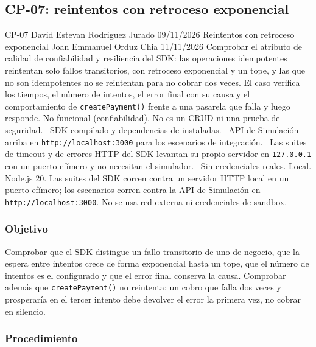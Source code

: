 \subsection{CP-07: reintentos con retroceso exponencial}
\label{sec:cp07}

\FichaCaso
  {CP-07}
  {David Estevan Rodriguez Jurado}
  {09/11/2026}
  {Reintentos con retroceso exponencial}
  {Joan Emmanuel Orduz Chia}
  {11/11/2026}
  {Comprobar el atributo de calidad de confiabilidad y resiliencia del SDK: las operaciones idempotentes reintentan solo fallos transitorios, con retroceso exponencial y un tope, y las que no son idempotentes no se reintentan para no cobrar dos veces. El caso verifica los tiempos, el número de intentos, el error final con su causa y el comportamiento de \texttt{createPayment()} frente a una pasarela que falla y luego responde.}
  {No funcional (confiabilidad). No es un CRUD ni una prueba de seguridad.}
  {\textbullet\ SDK compilado y dependencias de  instaladas.\newline
   \textbullet\ API de Simulación arriba en \texttt{http://localhost:3000} para los escenarios de integración.\newline
   \textbullet\ Las suites de timeout y de errores HTTP del SDK levantan su propio servidor en \texttt{127.0.0.1} con un puerto efímero y no necesitan el simulador.\newline
   \textbullet\ Sin credenciales reales.}
  {Local. Node.js 20. Las suites del SDK corren contra un servidor HTTP local en un puerto efímero; los escenarios corren contra la API de Simulación en \texttt{http://localhost:3000}. No se usa red externa ni credenciales de sandbox.}

\subsubsection{Objetivo}

Comprobar que el SDK distingue un fallo transitorio de uno de negocio, que la espera entre intentos crece de forma exponencial hasta un tope, que el número de intentos es el configurado y que el error final conserva la causa. Comprobar además que \texttt{createPayment()} no reintenta: un cobro que falla dos veces y prosperaría en el tercer intento debe devolver el error la primera vez, no cobrar en silencio.

\subsubsection{Procedimiento}

